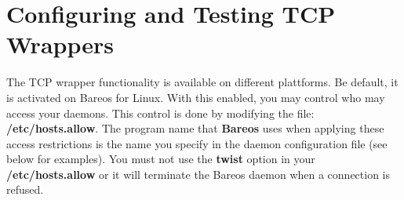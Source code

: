\label{wrappers}
\section{Configuring and Testing TCP Wrappers}

The TCP wrapper functionality is available on different plattforms.
Be default, it is activated on Bareos for Linux.
With this enabled, you may control who may access your
daemons.  This control is done by modifying the file: {\bf
/etc/hosts.allow}.  The program name that {\bf Bareos} uses when
applying these access restrictions is the name you specify in the
daemon configuration file (see below for examples).
You must not use the {\bf twist} option in your {\bf
/etc/hosts.allow} or it will terminate the Bareos daemon when a
connection is refused.

